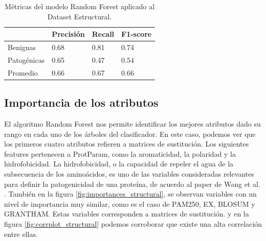 \begin{table}[H]
\centering
\begin{tabular}{|l|l|l|l|}
\hline
              & Precisión & Recall & F1-score \\ \hline
Benignas      & 0.68      & 0.81   & 0.74     \\ \hline
Patogénicas   & 0.65      & 0.47   & 0.54     \\ \hline
Promedio      & 0.66      & 0.67   & 0.66     \\ \hline
\end{tabular}
\caption{Métricas del modelo Random Forest aplicado al Dataset Estructural.}
\label{structural_table}
\end{table}


\subsection{Importancia de los atributos}

El algoritmo Random Forest nos permite identificar los mejores atributos dado su rango en cada uno de los árboles del clasificador. En este caso, podemos ver que los primeros cuatro atributos refieren a matrices de sustitución. Los siguientes features pertenecen a ProtParam, como la aromaticidad, la polaridad y la hidrofobicidad. La hidrofobicidad, o la capacidad de repeler el agua de la subsecuencia de los aminoácidos, es uno de las variables consideradas relevantes para definir la patogenicidad de una proteína, de acuerdo al paper de Wang et al. \cite{Wang2016}. También en la figura \ref{fig:importances_structural}, se observan variables con un nivel de importancia muy similar, como es el caso de PAM250, EX, BLOSUM y GRANTHAM. Estas variables corresponden a matrices de sustitución. y en la figura \ref{fig:corrplot_structural} podemos corroborar que existe una alta correlación entre ellas.

\pagebreak

